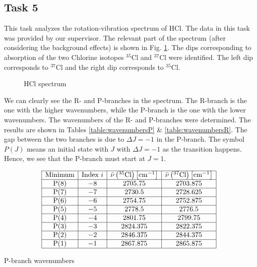 \documentclass{article}
\begin{document}
\subsection{Task 5}

This task analyzes the rotation-vibration spectrum of HCl. The data in this task was provided by our supervisor. The relevant part of the spectrum (after considering the background effects) is shown in Fig. \ref{fig:HCl}. The dips corresponding to absorption of the two Chlorine isotopes $^{35}$Cl and $^{37}$Cl were identified. The left dip corresponds to $^{37}$Cl and the right dip corresponds to $^{35}$Cl.

\begin{figure}[h!]
	\centering
	\scalebox{0.50}{}
	\caption{HCl spectrum}
	\label{fig:HCl}
\end{figure}

We can clearly see the R- and P-branches in the spectrum. The R-branch is the one with the higher wavenumbers, while the P-branch is the one with the lower wavenumbers. The wavenumbers of the R- and P-branches were determined. The results are shown in Tables \ref{table:wavenumbersP} \& \ref{table:wavenumbersR}. The gap between the two branches is due to $\Delta J = -1$ in the P-branch. The symbol $P(J)$ means an initial state with $J$ with $\Delta J = -1$ as the transition happens. Hence, we see that the P-branch must start at $J = 1$. 

\begin{table}[H]
    \centering
    \[
    \begin{array}{|c|c|c|c|}
    \hline \text{Minimum} & \text{Index } i & \bar{\nu}\left({ }^{35} \mathrm{Cl}\right)\left[\mathrm{cm}^{-1}\right] & \bar{\nu}\left({ }^{37} \mathrm{Cl}\right)\left[\mathrm{cm}^{-1}\right] \\
    \hline \mathrm{P}(8) & -8 & 2705.75 & 2703.875 \\
    \hline \mathrm{P}(7) & -7 & 2730.5 & 2728.625 \\
    \hline \mathrm{P}(6) & -6 & 2754.75 & 2752.875 \\
    \hline \mathrm{P}(5) & -5 & 2778.5 & 2776.5 \\
    \hline \mathrm{P}(4) & -4 & 2801.75 & 2799.75 \\
    \hline \mathrm{P}(3) & -3 & 2824.375 & 2822.375 \\
    \hline \mathrm{P}(2) & -2 & 2846.375 & 2844.375 \\
    \hline \mathrm{P}(1) & -1 & 2867.875 & 2865.875 \\
    \hline
    \end{array}
    \]
    \caption{P-branch wavenumbers}
    \label{table:wavenumbersP}
\end{table}
\end{document}
